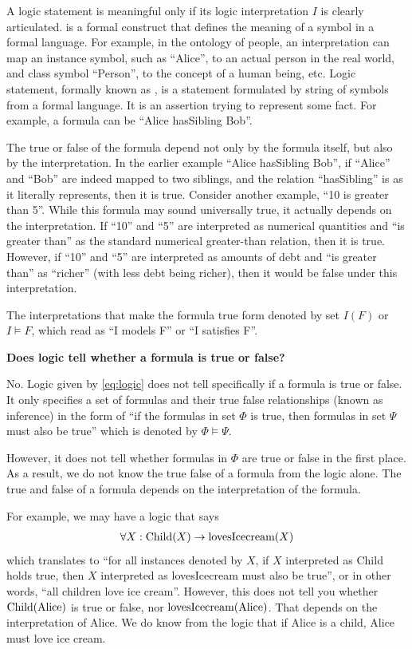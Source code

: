 A logic statement is meaningful only if its logic interpretation $I$ is clearly articulated.  is a formal construct that defines the meaning of a symbol in a formal language. For example, in the ontology of people, an interpretation can map an instance symbol, such as ``Alice'', to an actual person in the real world, and class symbol ``Person'', to the concept of a human being, etc. Logic statement, formally  known as , is a statement formulated by string of symbols from a formal language. It is an assertion trying to represent some fact. For example, a formula can be ``Alice hasSibling Bob''. 

The true or false of the formula depend not only by the formula itself, but also by the interpretation. In the earlier example ``Alice hasSibling Bob'', if ``Alice'' and ``Bob'' are indeed mapped to two siblings, and the relation ``hasSibling'' is as it literally represents, then it is true. Consider another example, ``10 is greater than 5''. While this formula may sound universally true, it actually depends on the interpretation. If ``10'' and ``5'' are interpreted as numerical quantities and ``is greater than'' as the standard numerical greater-than relation, then it is true. However, if ``10'' and ``5'' are interpreted as amounts of debt and ``is greater than'' as ``richer'' (with less debt being richer), then it would be false under this interpretation.

The interpretations that make the formula true form  denoted by set $I(F)$ or $I \models F$, which read as ``I models F'' or ``I satisfies F''. 

\begin{mdframed}
\noindent \textbf{Does logic tell whether a formula is true or false?}

No. Logic given by \eqref{eq:logic} does not tell specifically if a formula is true or false. It only specifies a set of formulas and their true false relationships (known as inference) in the form of ``if the formulas in set $\Phi$ is true, then formulas in set $\Psi$ must also be true'' which is denoted by $\Phi \models \Psi$.

However, it does not tell whether formulas in $\Phi$ are true or false in the first place. As a result, we do not know the true false of a formula from the logic alone. The true and false of a formula depends on the interpretation of the formula.

For example, we may have a logic that says
\begin{eqnarray}
	\forall X: \textup{Child}(X) \rightarrow \textup{lovesIcecream}(X) \nonumber
\end{eqnarray}
which translates to ``for all instances denoted by $X$, if $X$ interpreted as Child holds true, then $X$ interpreted as lovesIcecream must also be true'', or in other words, ``all children love ice cream''. However, this does not tell you whether $\textup{Child}(\textup{Alice})$ is true or false, nor $\textup{lovesIcecream}(\textup{Alice})$. That depends on the interpretation of Alice. We do know from the logic that if Alice is a child, Alice must love ice cream.

\end{mdframed}

